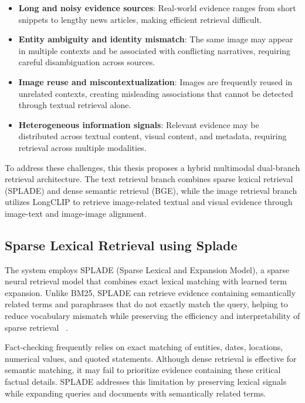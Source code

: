 \begin{itemize}
\item \textbf{Long and noisy evidence sources}: Real-world evidence ranges from short snippets to lengthy news articles, making efficient retrieval difficult.

\item \textbf{Entity ambiguity and identity mismatch}: The same image may appear in multiple contexts and be associated with conflicting narratives, requiring careful disambiguation across sources.

\item \textbf{Image reuse and miscontextualization}: Images are frequently reused in unrelated contexts, creating misleading associations that cannot be detected through textual retrieval alone.

\item \textbf{Heterogeneous information signals}: Relevant evidence may be distributed across textual content, visual content, and metadata, requiring retrieval across multiple modalities.

\end{itemize}

To address these challenges, this thesis proposes a hybrid multimodal dual-branch retrieval architecture. The text retrieval branch combines sparse lexical retrieval (SPLADE) and dense semantic retrieval (BGE), while the image retrieval branch utilizes LongCLIP to retrieve image-related textual and visual evidence through image-text and image-image alignment.

\subsection{Sparse Lexical Retrieval using Splade}
The system employs SPLADE (Sparse Lexical and Expansion Model), a sparse neural retrieval model that combines exact lexical matching with learned term expansion. Unlike BM25, SPLADE can retrieve evidence containing semantically related terms and paraphrases that do not exactly match the query, helping to reduce vocabulary mismatch while preserving the efficiency and interpretability of sparse retrieval ~\cite{Formal2021Sep}.

Fact-checking frequently relies on exact matching of entities, dates, locations, numerical values, and quoted statements. Although dense retrieval is effective for semantic matching, it may fail to prioritize evidence containing these critical factual details. SPLADE addresses this limitation by preserving lexical signals while expanding queries and documents with semantically related terms.

